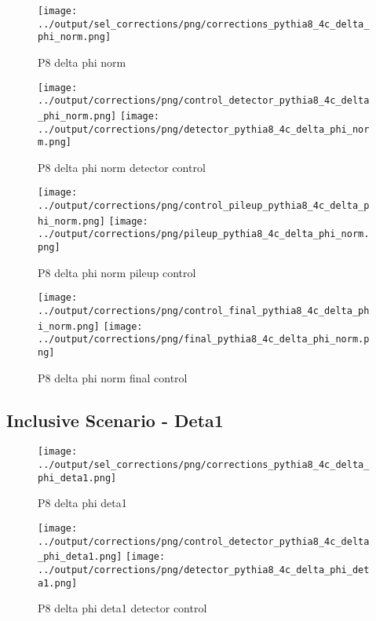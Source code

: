 \documentclass[11pt]{book}
\begin{document}
\begin{figure}[ht]
\centering
\texttt{[image: ../output/sel\_corrections/png/corrections\_pythia8\_4c\_delta\_phi\_norm.png]}
\caption{P8 delta phi norm}
\label{fig:p8_delta_phi_norm}
\end{figure}

\begin{figure}[ht]
\centering
\texttt{[image: ../output/corrections/png/control\_detector\_pythia8\_4c\_delta\_phi\_norm.png]}
\texttt{[image: ../output/corrections/png/detector\_pythia8\_4c\_delta\_phi\_norm.png]}
\caption{P8 delta phi norm detector control}
\label{fig:p8_delta_phi_norm_detector_control}
\end{figure}

\begin{figure}[ht]
\centering
\texttt{[image: ../output/corrections/png/control\_pileup\_pythia8\_4c\_delta\_phi\_norm.png]}
\texttt{[image: ../output/corrections/png/pileup\_pythia8\_4c\_delta\_phi\_norm.png]}
\caption{P8 delta phi norm pileup control}
\label{fig:p8_delta_phi_norm_pileup_control}
\end{figure}

\begin{figure}[ht]
\centering
\texttt{[image: ../output/corrections/png/control\_final\_pythia8\_4c\_delta\_phi\_norm.png]}
\texttt{[image: ../output/corrections/png/final\_pythia8\_4c\_delta\_phi\_norm.png]}
\caption{P8 delta phi norm final control}
\label{fig:p8_delta_phi_norm_final_control}
\end{figure}

\clearpage
\subsection{Inclusive Scenario - Deta1}
\begin{figure}[ht]
\centering
\texttt{[image: ../output/sel\_corrections/png/corrections\_pythia8\_4c\_delta\_phi\_deta1.png]}
\caption{P8 delta phi deta1}
\label{fig:p8_delta_phi_deta1}
\end{figure}

\begin{figure}[ht]
\centering
\texttt{[image: ../output/corrections/png/control\_detector\_pythia8\_4c\_delta\_phi\_deta1.png]}
\texttt{[image: ../output/corrections/png/detector\_pythia8\_4c\_delta\_phi\_deta1.png]}
\caption{P8 delta phi deta1 detector control}
\label{fig:p8_delta_phi_deta1_detector_control}
\end{figure}
\end{document}
